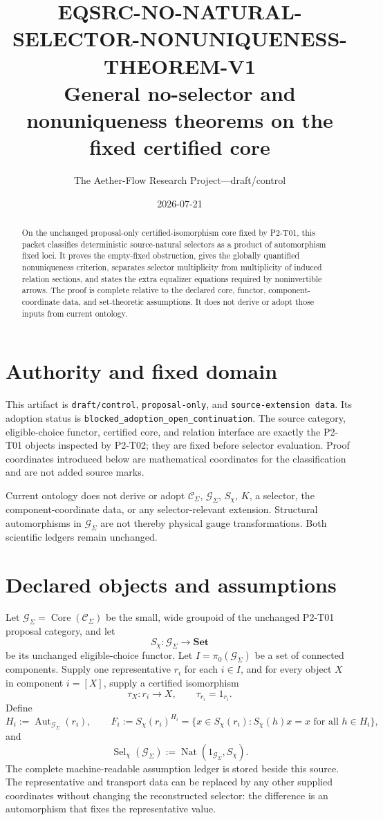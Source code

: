 \documentclass[11pt]{article}
\title{EQSRC-NO-NATURAL-SELECTOR-NONUNIQUENESS-THEOREM-V1\\
General no-selector and nonuniqueness theorems on the fixed certified core}
\author{The Aether-Flow Research Project---draft/control}
\date{2026-07-21}
\theoremstyle{definition}
\newcommand{\G}{\mathcal G_{\Sigma}}
\newcommand{\C}{\mathcal C_{\Sigma}}
\newcommand{\Sel}{\operatorname{Sel}_{\chi}}
\newcommand{\Nat}{\operatorname{Nat}}
\newcommand{\Aut}{\operatorname{Aut}}
\begin{document}
\maketitle

\begin{abstract}
On the unchanged proposal-only certified-isomorphism core fixed by P2-T01,
this packet classifies deterministic source-natural selectors as a product of
automorphism fixed loci. It proves the empty-fixed obstruction, gives the
globally quantified nonuniqueness criterion, separates selector multiplicity
from multiplicity of induced relation sections, and states the extra equalizer
equations required by noninvertible arrows. The proof is complete relative
to the declared core, functor, component-coordinate data, and set-theoretic
assumptions. It does not derive or adopt those inputs from current ontology.
\end{abstract}

\section{Authority and fixed domain}

This artifact is \texttt{draft/control}, \texttt{proposal-only}, and
\texttt{source-extension data}. Its adoption status is
\texttt{blocked\_adoption\_open\_continuation}. The source category,
eligible-choice functor, certified core, and relation interface are exactly
the P2-T01 objects inspected by P2-T02; they are fixed before selector
evaluation. Proof coordinates introduced below are mathematical coordinates
for the classification and are not added source marks.

Current ontology does not derive or adopt \(\C\), \(\G\), \(S_\chi\),
\(K\), a selector, the component-coordinate data, or any selector-relevant
extension. Structural automorphisms in \(\G\) are not thereby physical
gauge transformations. Both scientific ledgers remain unchanged.

\section{Declared objects and assumptions}

Let \(\G=\operatorname{Core}(\C)\) be the small, wide groupoid of the
unchanged P2-T01 proposal category, and let
\[
  S_\chi:\G\longrightarrow \mathbf{Set}
\]
be its unchanged eligible-choice functor. Let \(I=\pi_0(\G)\) be a set of
connected components. Supply one representative \(r_i\) for each
\(i\in I\), and for every object \(X\) in component \(i=[X]\), supply a
certified isomorphism
\[
  \tau_X:r_i\longrightarrow X,
  \qquad \tau_{r_i}=1_{r_i}.
\]
Define
\[
  H_i:=\Aut_{\G}(r_i),
  \qquad
  F_i:=S_\chi(r_i)^{H_i}
      =\{x\in S_\chi(r_i):S_\chi(h)x=x\text{ for all }h\in H_i\},
\]
and
\[
  \Sel(\G):=\Nat(1_{\G},S_\chi).
\]
The complete machine-readable assumption ledger is stored beside this source.
The representative and transport data can be replaced by any other supplied
coordinates without changing the reconstructed selector: the difference is
an automorphism that fixes the representative value.
\end{document}
